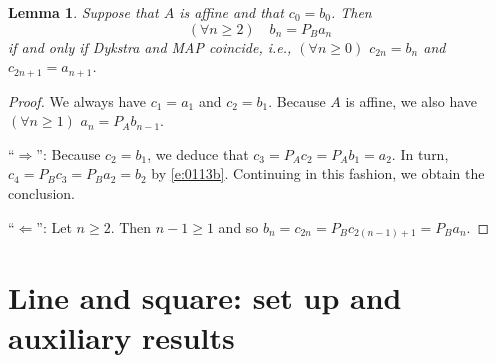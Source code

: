 \documentclass[12pt]{article}
\newtheorem{lemma}[theorem]{Lemma}
\begin{document}
\begin{lemma}
\label{l:0113b}
Suppose that $A$ is affine and that $c_{0} = b_0$. 
Then 
\begin{equation}
\label{e:0113b}
(\forall n\geq 2) \quad b_n = P_Ba_n
\end{equation}
if and only if 
Dykstra and MAP coincide, i.e.,
$(\forall n\geq 0)$
$c_{2n} = b_n$ and $c_{2n+1} = a_{n+1}$.
\end{lemma}
\begin{proof}
We always have $c_1=a_1$ and $c_2=b_1$. 
Because $A$ is affine, we also have 
$(\forall n\geq 1)$
$a_n = P_Ab_{n-1}$.

``$\Rightarrow$'':
Because $c_{2} = b_1$, we deduce that 
$c_{3} = P_Ac_{2} = P_Ab_1 = a_{2}$.
In turn, $c_{4} = P_Bc_{3} = P_Ba_{2} = b_{2}$ 
by \eqref{e:0113b}.
Continuing in this fashion, we obtain the conclusion.

``$\Leftarrow$'':
Let $n\geq 2$.
Then $n-1\geq 1$ and 
so 
$b_n = c_{2n} = P_Bc_{2(n-1)+1} = P_Ba_n$. 
\end{proof}

\section{Line and square: set up and auxiliary results}

\label{s:aux}
\end{document}
